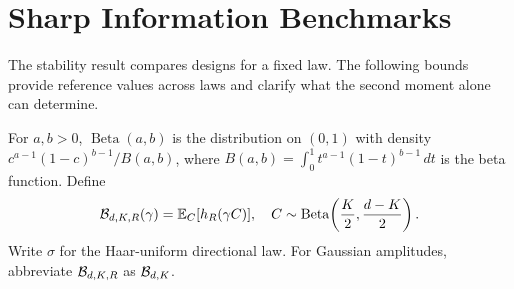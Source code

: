 \section{Sharp Information Benchmarks}
The stability result compares designs for a fixed law. The following bounds provide reference values across laws and clarify what the second moment alone can determine.

For $a,b>0$, $\operatorname{Beta}(a,b)$ is the distribution on $(0,1)$ with density $c^{a-1}(1-c)^{b-1}/B(a,b)$, where $B(a,b)=\int_0^1t^{a-1}(1-t)^{b-1}\,dt$ is the beta function. Define
\begin{equation}
\mathcal B_{d,K,R}(\gamma)=\mathbb E_C[h_R(\gamma C)],\quad
C\sim\operatorname{Beta}\!\left(\frac K2,\frac{d-K}{2}\right).
\label{eq:Bbase}
\end{equation}
Write $\sigma$ for the Haar-uniform directional law. For Gaussian amplitudes, abbreviate $\mathcal B_{d,K,R}$ as $\mathcal B_{d,K}$.


